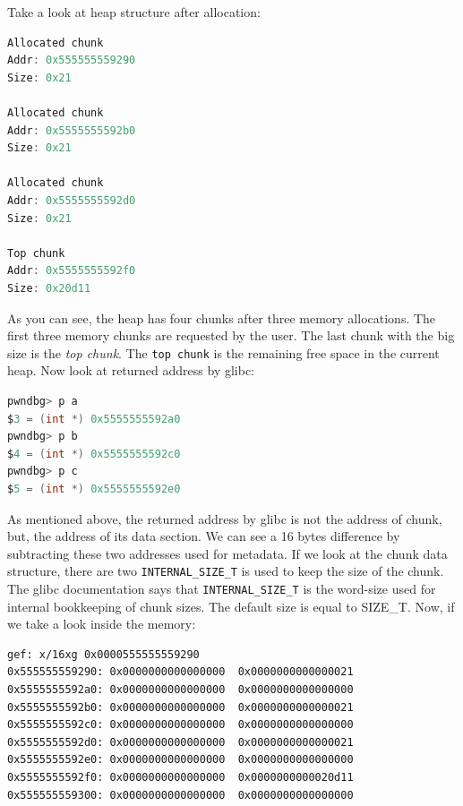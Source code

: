 \documentclass{masterthesis}
\newcommand*\sizet{SIZE\_T}
\newcommand*\libc{glibc}
\begin{document}
Take a look at heap structure after allocation:

\begin{lstlisting}[language=c,frame=tlrb]
Allocated chunk
Addr: 0x555555559290
Size: 0x21

Allocated chunk
Addr: 0x5555555592b0
Size: 0x21

Allocated chunk
Addr: 0x5555555592d0
Size: 0x21

Top chunk
Addr: 0x5555555592f0
Size: 0x20d11
\end{lstlisting}

As you can see, the heap has four chunks after three memory allocations. The first three memory chunks are requested by the user. The last chunk with the big size is the \emph{top chunk}. The \lstinline{top chunk} is the remaining free space in the current heap. Now look at returned address by \libc{}:

\begin{lstlisting}[language=c,frame=tlrb]
pwndbg> p a
$3 = (int *) 0x5555555592a0
pwndbg> p b
$4 = (int *) 0x5555555592c0
pwndbg> p c
$5 = (int *) 0x5555555592e0
\end{lstlisting}

As mentioned above, the returned address by \libc{} is not the address of chunk, but, the address of its data section. We can see a 16 bytes difference by subtracting these two addresses used for metadata. If we look at the chunk data structure, there are two \lstinline{INTERNAL_SIZE_T} is used to keep the size of the chunk. The \libc{} documentation says that \lstinline{INTERNAL_SIZE_T} is the word-size used for internal bookkeeping of chunk sizes. The default size is equal to \sizet{}. Now, if we take a look inside the memory:

\begin{lstlisting}[frame=tlrb]
gef: x/16xg 0x0000555555559290
0x555555559290:	0x0000000000000000	0x0000000000000021
0x5555555592a0:	0x0000000000000000	0x0000000000000000
0x5555555592b0:	0x0000000000000000	0x0000000000000021
0x5555555592c0:	0x0000000000000000	0x0000000000000000
0x5555555592d0:	0x0000000000000000	0x0000000000000021
0x5555555592e0:	0x0000000000000000	0x0000000000000000
0x5555555592f0:	0x0000000000000000	0x0000000000020d11
0x555555559300:	0x0000000000000000	0x0000000000000000
\end{lstlisting}
\end{document}
